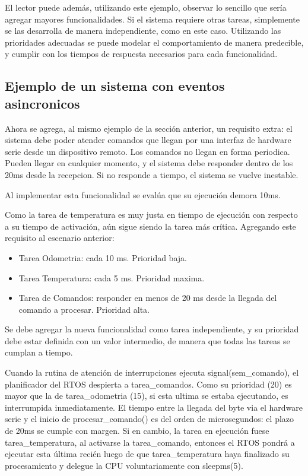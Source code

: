 \documentclass[output=paper, 
colorlinks,
citecolor=brown,
newtxmath
]{langscibook}
\begin{document}
El lector puede además, utilizando este ejemplo, observar lo sencillo
que sería agregar mayores funcionalidades. Si el sistema requiere
otras tareas, simplemente se las desarrolla de manera independiente, como 
en este caso. Utilizando las prioridades adecuadas se puede modelar
el comportamiento de manera predecible, y cumplir con los tiempos
de respuesta necesarios para cada funcionalidad.


\subsection{Ejemplo de un sistema con eventos asincronicos}

Ahora se agrega, al mismo ejemplo de la sección anterior,  
un requisito extra:
el sistema debe poder atender comandos que 
llegan por una interfaz de hardware serie desde un dispositivo remoto.
Los comandos no llegan en forma periodica. Pueden llegar en cualquier 
momento, y el sistema debe responder dentro de los 20ms desde la recepcion. 
Si no responde a tiempo, el sistema se vuelve inestable.

Al implementar esta funcionalidad se evalúa que su ejecución demora 10ms.

Como la tarea de temperatura es muy justa en tiempo de ejecución con
respecto a su tiempo de activación, aún sigue siendo la tarea más crítica.
Agregando este requisito al escenario anterior:
\begin{itemize}
	\item Tarea Odometria: cada 10 ms. Prioridad baja.
	\item Tarea Temperatura: cada 5 ms. Prioridad maxima.
	\item Tarea de Comandos: responder en menos de 20 ms desde la llegada del comando a procesar. Prioridad alta.
\end{itemize}

Se debe agregar la nueva funcionalidad
como tarea independiente, y su prioridad debe estar definida con un valor
intermedio, de manera que todas las tareas se cumplan a tiempo.



Cuando la rutina de atención de interrupciones ejecuta signal(sem\_comando), el planificador del RTOS despierta a tarea\_comandos. Como su prioridad (20) es mayor que la de tarea\_odometria (15), si esta ultima se estaba ejecutando, es interrumpida inmediatamente. El tiempo entre la llegada del byte via el hardware serie y el inicio de procesar\_comando() es del orden de microsegundos: el plazo de 20ms se cumple con margen. 
Si en cambio, la tarea en ejecución fuese tarea\_temperatura, al activarse la tarea\_comando, entonces el RTOS pondrá a ejecutar esta última recién luego de que tarea\_temperatura haya finalizado su procesamiento y delegue la CPU voluntariamente con sleepms(5).
\end{document}
